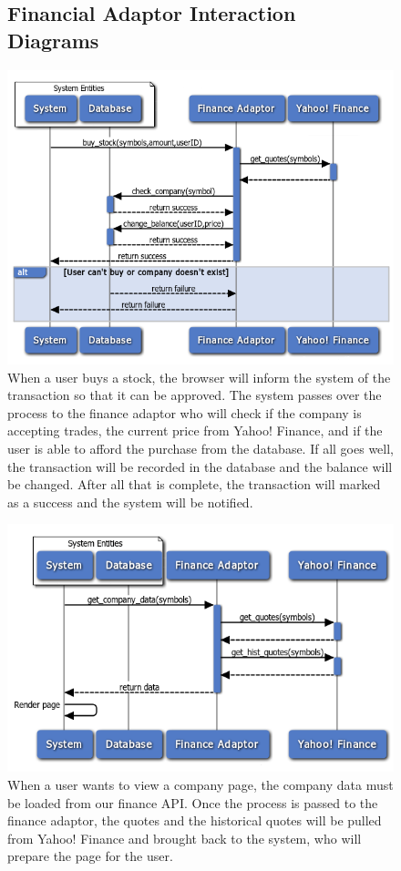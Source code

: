 \begin{figure}
\subsection{Financial Adaptor Interaction Diagrams}
\centering
\includegraphics[width=5.5in]{./Diagrams/InteractionDiagrams/buyingstock.png}
\caption{When a user buys a stock, the browser will inform the system of the transaction so that it can be approved. The system passes over the process to the finance adaptor who will check if the company is accepting trades, the current price from Yahoo! Finance, and if the user is able to afford the purchase from the database. If all goes well, the transaction will be recorded in the database and the balance will be changed. After all that is complete, the transaction will marked as a success and the system will be notified.}
\end{figure}

\begin{figure}
\centering
\includegraphics[width=5.5in]{./Diagrams/InteractionDiagrams/rendercompanypage.png}
\caption{When a user wants to view a company page, the company data must be loaded from our finance API. Once the process is passed to the finance adaptor, the quotes and the historical quotes will be pulled from Yahoo! Finance and brought back to the system, who will prepare the page for the user.}
\end{figure}

